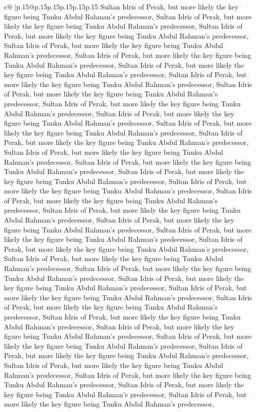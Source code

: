 \documentclass{article}
\begin{document}
{\begin{supertabular}{c@{$\;$}|p{.15\linewidth}@{}p{.15\linewidth}p{.15\linewidth}p{.15\linewidth}p{.15\linewidth}p{.15\linewidth}}
{{{Sultan Idris of Perak, but more likely the key figure being Tunku Abdul Rahman's predecessor, Sultan Idris of Perak, but more likely the key figure being Tunku Abdul Rahman's predecessor, Sultan Idris of Perak, but more likely the key figure being Tunku Abdul Rahman's predecessor, Sultan Idris of Perak, but more likely the key figure being Tunku Abdul Rahman's predecessor, Sultan Idris of Perak, but more likely the key figure being Tunku Abdul Rahman's predecessor, Sultan Idris of Perak, but more likely the key figure being Tunku Abdul Rahman's predecessor, Sultan Idris of Perak, but more likely the key figure being Tunku Abdul Rahman's predecessor, Sultan Idris of Perak, but more likely the key figure being Tunku Abdul Rahman's predecessor, Sultan Idris of Perak, but more likely the key figure being Tunku Abdul Rahman's predecessor, Sultan Idris of Perak, but more likely the key figure being Tunku Abdul Rahman's predecessor, Sultan Idris of Perak, but more likely the key figure being Tunku Abdul Rahman's predecessor, Sultan Idris of Perak, but more likely the key figure being Tunku Abdul Rahman's predecessor, Sultan Idris of Perak, but more likely the key figure being Tunku Abdul Rahman's predecessor, Sultan Idris of Perak, but more likely the key figure being Tunku Abdul Rahman's predecessor, Sultan Idris of Perak, but more likely the key figure being Tunku Abdul Rahman's predecessor, Sultan Idris of Perak, but more likely the key figure being Tunku Abdul Rahman's predecessor, Sultan Idris of Perak, but more likely the key figure being Tunku Abdul Rahman's predecessor, Sultan Idris of Perak, but more likely the key figure being Tunku Abdul Rahman's predecessor, Sultan Idris of Perak, but more likely the key figure being Tunku Abdul Rahman's predecessor, Sultan Idris of Perak, but more likely the key figure being Tunku Abdul Rahman's predecessor, Sultan Idris of Perak, but more likely the key figure being Tunku Abdul Rahman's predecessor, Sultan Idris of Perak, but more likely the key figure being Tunku Abdul Rahman's predecessor, Sultan Idris of Perak, but more likely the key figure being Tunku Abdul Rahman's predecessor, Sultan Idris of Perak, but more likely the key figure being Tunku Abdul Rahman's predecessor, Sultan Idris of Perak, but more likely the key figure being Tunku Abdul Rahman's predecessor, Sultan Idris of Perak, but more likely the key figure being Tunku Abdul Rahman's predecessor, Sultan Idris of Perak, but more likely the key figure being Tunku Abdul Rahman's predecessor, Sultan Idris of Perak, but more likely the key figure being Tunku Abdul Rahman's predecessor, Sultan Idris of Perak, but more likely the key figure being Tunku Abdul Rahman's predecessor, Sultan Idris of Perak, but more likely the key figure being Tunku Abdul Rahman's predecessor, Sultan Idris of Perak, but more likely the key figure being Tunku Abdul Rahman's predecessor, Sultan Idris of Perak, but more likely the key figure being Tunku Abdul Rahman's predecessor, Sultan Idris of Perak, but more likely the key figure being Tunku Abdul Rahman's predecessor, Sultan Idris of Perak, but more likely the key figure being Tunku Abdul Rahman's predecessor, }}}
\end{supertabular}}
\end{document}

